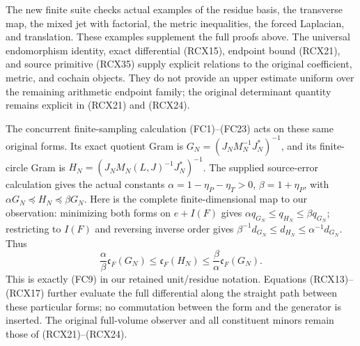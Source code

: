 The new finite suite checks actual examples of the residue basis,
the transverse map, the mixed jet with factorial, the metric
inequalities, the forced Laplacian, and translation. These examples
supplement the full proofs above. The universal endomorphism
identity, exact differential (RCX15), endpoint bound (RCX21), and
source primitive (RCX35) supply explicit relations to the original
coefficient, metric, and cochain objects. They do not provide an
upper estimate uniform over the remaining arithmetic endpoint
family; the original determinant quantity remains explicit in
(RCX21) and (RCX24).

The concurrent finite-sampling calculation (FC1)--(FC23) acts on
these same original forms. Its exact quotient Gram is
\(G_N=(J_NM_N^{-1}J_N^*)^{-1}\), and its finite-circle Gram is
\(H_N=(J_NM_N(L,J)^{-1}J_N^*)^{-1}\).
The supplied source-error calculation gives the actual constants
\(\alpha=1-\eta_P-\eta_T>0\), \(\beta=1+\eta_P\), with
\(\alpha G_N\preceq H_N\preceq\beta G_N\).
Here is the complete finite-dimensional map to our observation:
minimizing both forms on \(e+I(F)\) gives
\(\alpha q_{G_N}\le q_{H_N}\le\beta q_{G_N}\);
restricting to \(I(F)\) and reversing inverse order gives
\(\beta^{-1}d_{G_N}\le d_{H_N}\le\alpha^{-1}d_{G_N}\).
Thus
\[
 \frac{\alpha}{\beta}\mathfrak c_F(G_N)
 \le\mathfrak c_F(H_N)
 \le\frac{\beta}{\alpha}\mathfrak c_F(G_N).
 \tag{RCX40}
\]
This is exactly (FC9) in our retained unit/residue notation.
Equations (RCX13)--(RCX17) further evaluate the full differential
along the straight path between these particular forms; no
commutation between the form and the generator is inserted.
The original full-volume observer and all constituent minors
remain those of (RCX21)--(RCX24).


\endgroup

